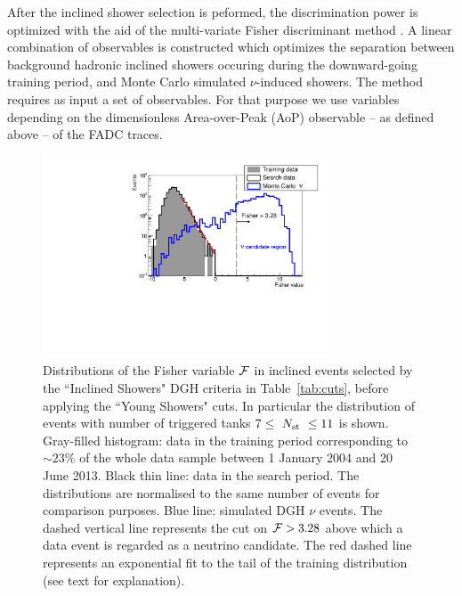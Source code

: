 \documentclass[reprint,showpacs,showkeys,amsmath,amssymb,aps,nofootinbib]{revtex4-1}
\begin{document}
After the inclined shower selection is peformed, the discrimination power is optimized 
with the aid of the multi-variate Fisher discriminant method \cite{Fisher}. 
A linear combination of observables is constructed which optimizes the separation between
background hadronic inclined showers occuring during 
the downward-going training period, and Monte Carlo
simulated $\nu$-induced showers. The method requires as input 
a set of observables. For that purpose 
we use variables depending on the dimensionless Area-over-Peak (AoP) 
observable -- as defined above -- of the FADC traces. 

\begin{figure}[t!]
\centering
\includegraphics[width=8.5cm]{./Unblinding_DGH_med_200613.pdf}
\vskip -3mm
\caption{
Distributions of the Fisher variable $\cal F$ 
in inclined events selected by the ``Inclined Showers" DGH criteria 
in Table~\ref{tab:cuts}, before applying the ``Young Showers" cuts. 
In particular the distribution of events with number of triggered
tanks $7\leq~N_{\rm st}~\leq11$ is shown. 
Gray-filled histogram: data 
in the training period corresponding to $\sim23\%$ of the whole
data sample between 1 January 2004 and 20 June 2013. 
Black thin line: data 
in the search period. The distributions are normalised to the same number 
of events for comparison purposes. Blue line: 
simulated DGH $\nu$ events. The dashed vertical line represents 
the cut on ${\cal F} > 3.28$ above which a data event is regarded as a neutrino candidate.
The red dashed line represents an exponential fit to the tail of the training distribution (see text
for explanation). 
}
\label{fig:Fisher}
\end{figure}
\end{document}
